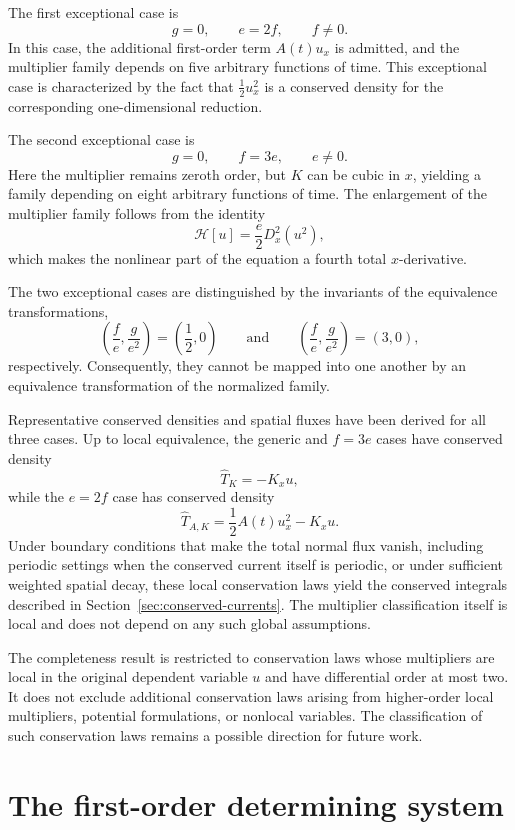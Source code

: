 \documentclass[11pt]{article}
\numberwithin{equation}{section}
\theoremstyle{definition}
\theoremstyle{remark}
\begin{document}
The first exceptional case is
\[
g=0,
\qquad
e=2f,
\qquad
f\neq0.
\]
In this case, the additional first-order term $A(t)u_x$ is admitted,
and the multiplier family depends on five arbitrary functions of
time. This exceptional case is characterized by the fact that
$\tfrac12u_x^2$ is a conserved density for the corresponding
one-dimensional reduction.

The second exceptional case is
\[
g=0,
\qquad
f=3e,
\qquad
e\neq0.
\]
Here the multiplier remains zeroth order, but $K$ can be cubic in
$x$, yielding a family depending on eight arbitrary functions of
time. The enlargement of the multiplier family follows from the
identity
\[
\mathcal{H}[u]
=
\frac{e}{2}D_x^2(u^2),
\]
which makes the nonlinear part of the equation a fourth total
$x$-derivative.

The two exceptional cases are distinguished by the invariants of the
equivalence transformations,
\[
\left(
\frac{f}{e},
\frac{g}{e^2}
\right)
=
\left(\frac12,0\right)
\qquad\text{and}\qquad
\left(
\frac{f}{e},
\frac{g}{e^2}
\right)
=
(3,0),
\]
respectively. Consequently, they cannot be mapped into one another by
an equivalence transformation of the normalized family.

Representative conserved densities and spatial fluxes have been
derived for all three cases. Up to local equivalence, the generic and
$f=3e$ cases have conserved density
\[
\widehat{T}_K=-K_xu,
\]
while the $e=2f$ case has conserved density
\[
\widehat{T}_{A,K}
=
\frac12A(t)u_x^2-K_xu.
\]
Under boundary conditions that make the total normal flux vanish,
including periodic settings when the conserved current itself is
periodic, or under sufficient weighted spatial decay, these local
conservation laws yield the conserved integrals described in
Section~\ref{sec:conserved-currents}. The
multiplier classification itself is local and does not depend on any
such global assumptions.

The completeness result is restricted to conservation laws whose
multipliers are local in the original dependent variable $u$ and have
differential order at most two. It does not exclude additional
conservation laws arising from higher-order local multipliers,
potential formulations, or nonlocal variables. The classification of
such conservation laws remains a possible direction for future work.

\appendix

\section{The first-order determining system}
\label{app:determining-system}
\end{document}

